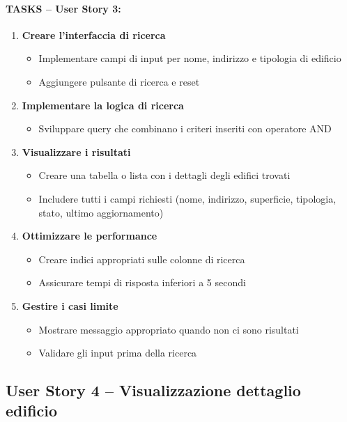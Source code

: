 \paragraph*{TASKS – User Story 3:}
\begin{enumerate}
    \item \textbf{Creare l'interfaccia di ricerca}
    \begin{itemize}
        \item Implementare campi di input per nome, indirizzo e tipologia di edificio
        \item Aggiungere pulsante di ricerca e reset
    \end{itemize}
    \item \textbf{Implementare la logica di ricerca}
    \begin{itemize}
        \item Sviluppare query che combinano i criteri inseriti con operatore AND
    \end{itemize}
    \item \textbf{Visualizzare i risultati}
    \begin{itemize}
        \item Creare una tabella o lista con i dettagli degli edifici trovati
        \item Includere tutti i campi richiesti (nome, indirizzo, superficie, tipologia, stato, ultimo aggiornamento)
    \end{itemize}
    \item \textbf{Ottimizzare le performance}
    \begin{itemize}
        \item Creare indici appropriati sulle colonne di ricerca
        \item Assicurare tempi di risposta inferiori a 5 secondi
    \end{itemize}
    \item \textbf{Gestire i casi limite}
    \begin{itemize}
        \item Mostrare messaggio appropriato quando non ci sono risultati
        \item Validare gli input prima della ricerca
    \end{itemize}
\end{enumerate}


\subsection{User Story 4 – Visualizzazione dettaglio edificio}
\label{us:dettaglioEdificio}

